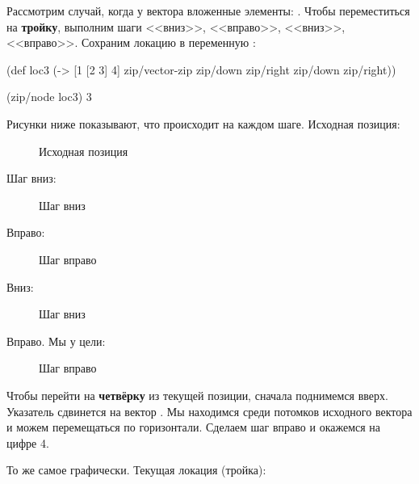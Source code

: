 Рассмотрим случай, когда у вектора вложенные элементы: \code{[1 [2 3] 4]}. Чтобы
переместиться на \textbf{тройку}, выполним шаги <<вниз>>, <<вправо>>, <<вниз>>,
<<вправо>>. Сохраним локацию в переменную :

\begin{english}
  \begin{clojure}
(def loc3
  (-> [1 [2 3] 4]
      zip/vector-zip
      zip/down
      zip/right
      zip/down
      zip/right))

(zip/node loc3)
3
  \end{clojure}
\end{english}

Рисунки ниже показывают, что происходит на каждом шаге. Исходная позиция:

\begin{figure}[ht!]
  \centering
  \caption{Исходная позиция}
  \label{fig:chart-zip-04}
\end{figure}

Шаг вниз:

\begin{figure}[ht!]
  \centering
  \caption{Шаг вниз}
  \label{fig:chart-zip-05}
\end{figure}

Вправо:

\begin{figure}[ht!]
  \centering
  \caption{Шаг вправо}
  \label{fig:chart-zip-06}
\end{figure}

Вниз:

\begin{figure}[ht!]
  \centering
  \caption{Шаг вниз}
  \label{fig:chart-zip-07}
\end{figure}

Вправо. Мы у цели:

\begin{figure}[ht!]
  \centering
  \caption{Шаг вправо}
  \label{fig:chart-zip-08}
\end{figure}

Чтобы перейти на \textbf{четвёрку} из текущей позиции, сначала поднимемся
вверх. Указатель сдвинется на вектор \code{[2 3]}. Мы находимся среди потомков
исходного вектора и можем перемещаться по горизонтали. Сделаем шаг вправо и
окажемся на цифре 4.

То же самое графически. Текущая локация (тройка):


